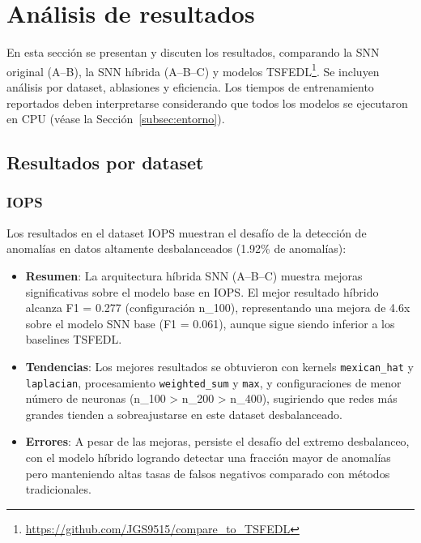 \section{Análisis de resultados}

En esta sección se presentan y discuten los resultados, comparando la SNN original (A--B), la SNN híbrida (A--B--C) y modelos TSFEDL\footnote{\url{https://github.com/JGS9515/compare_to_TSFEDL}}. Se incluyen análisis por dataset, ablasiones y eficiencia.  Los tiempos de entrenamiento reportados deben interpretarse considerando que todos los modelos se ejecutaron en CPU (véase la Sección~\ref{subsec:entorno}).

\subsection{Resultados por dataset}

\subsubsection{IOPS}
Los resultados en el dataset IOPS muestran el desafío de la detección de anomalías en datos altamente desbalanceados (1.92\% de anomalías):
\begin{itemize}
    \item \textbf{Resumen}: La arquitectura híbrida SNN (A--B--C) muestra mejoras significativas sobre el modelo base en IOPS. El mejor resultado híbrido alcanza F1 = 0.277 (configuración n\_100), representando una mejora de 4.6x sobre el modelo SNN base (F1 = 0.061), aunque sigue siendo inferior a los baselines TSFEDL.
    \item \textbf{Tendencias}: Los mejores resultados se obtuvieron con kernels \texttt{mexican\_hat} y \texttt{laplacian}, procesamiento \texttt{weighted\_sum} y \texttt{max}, y configuraciones de menor número de neuronas (n\_100 > n\_200 > n\_400), sugiriendo que redes más grandes tienden a sobreajustarse en este dataset desbalanceado.
    \item \textbf{Errores}: A pesar de las mejoras, persiste el desafío del extremo desbalanceo, con el modelo híbrido logrando detectar una fracción mayor de anomalías pero manteniendo altas tasas de falsos negativos comparado con métodos tradicionales.
\end{itemize}

